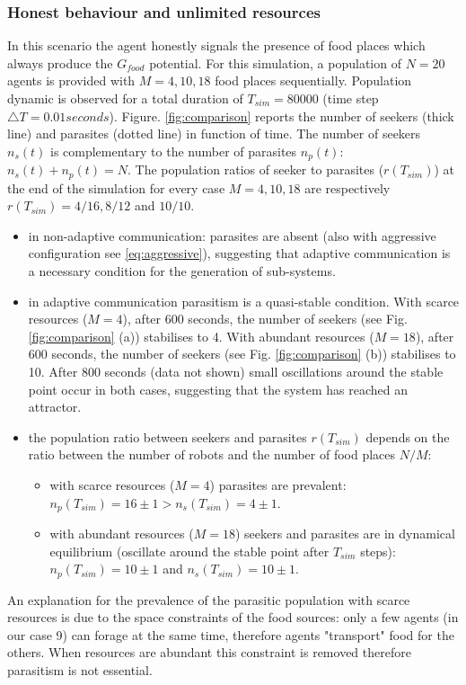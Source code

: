 \subsubsection{Honest behaviour and unlimited resources}
In this scenario the agent honestly signals the presence of food places which
always produce the $G_{food}$ potential.
For this simulation, a population of $N=20$ agents is provided with $M=4,10,18$
food places sequentially. Population dynamic is observed for a total duration
of  $T_{sim}=80000$ (time step $\triangle T=0.01 seconds$).
Figure. \ref{fig:comparison} reports the number of seekers (thick line) and
parasites (dotted line) in function of time. 
The number of seekers $n_{s}(t)$ is complementary to the number of parasites 
$n_{p}(t)$: $n_{s}(t)+n_{p}(t)=N$.
The population ratios of seeker to parasites ($r(T_{sim})$) at the end of the
 simulation for every case $M=4,10,18$ are respectively $r(T_{sim})=4/16,8/12$ and $10/10$.
\begin{itemize}
\item in non-adaptive communication: parasites are absent (also with aggressive configuration see \ref{eq:aggressive}), suggesting that adaptive communication is a necessary condition for the generation of sub-systems.
\item in adaptive communication parasitism is a quasi-stable condition. With scarce resources ($M=4$), after 600 seconds, the number of seekers (see Fig. \ref{fig:comparison} (a)) stabilises to 4. With abundant resources ($M=18$), after 600 seconds, the number of seekers (see Fig. \ref{fig:comparison} (b)) stabilises to 10. After 800 seconds (data not shown) small oscillations around the stable point occur in both cases, suggesting that the system has reached an attractor.
\item the population ratio between seekers and parasites $r(T_{sim})$ depends on the ratio between the number of robots and the number of food places $N/M$:
\begin{itemize}
\item with scarce resources ($M=4$) parasites are prevalent: $n_{p}(T_{sim})=16\pm1 > n_{s}(T_{sim})=4\pm1$.
\item with abundant resources ($M=18$) seekers and parasites are in dynamical equilibrium (oscillate around the stable point after $T_{sim}$ steps): $n_{p}(T_{sim})=10\pm1$ and $n_{s}(T_{sim})=10\pm1$.
\end{itemize}
\end{itemize}
An explanation for the prevalence of the parasitic population with scarce resources is due to the space constraints of the food sources: only a few agents (in our case 9) can forage at the same time, therefore agents "transport" food for the others. When resources are abundant this constraint is removed therefore parasitism is not essential.

